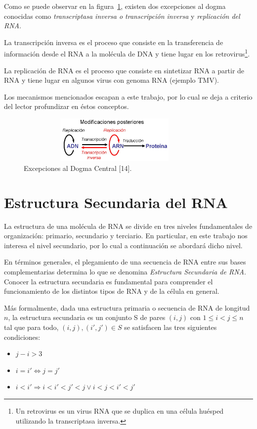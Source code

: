 \par Como se puede observar en la figura~\ref{excepcionesDogma}, existen dos excepciones al dogma conocidas como \textit{transcriptasa inversa o transcripción inversa} y \textit{replicación del RNA}.
\par La transcripción inversa\cite{curtis} es el proceso que consiste en la transferencia de información desde el RNA a la molécula de DNA y tiene lugar en los retrovirus\footnote{Un retrovirus es un virus RNA que se duplica en una célula huésped utilizando la transcriptasa inversa.}.
\par La replicación de RNA\cite{curtis} es el proceso que consiste en sintetizar RNA a partir de RNA y tiene lugar en algunos virus con genoma RNA (ejemplo TMV).
\par Los mecanismos mencionados escapan a este trabajo, por lo cual se deja a criterio del lector profundizar en éstos conceptos.
\begin{figure} [h]
	\hspace*{2cm}\includegraphics[width=3.8209in,height=0.9000in]{image/excepcionesDogma.jpg}
	\caption{Excepciones al Dogma Central [14].}
	\label{excepcionesDogma}
\end{figure}	

\vskip 1cm
\section{Estructura Secundaria del RNA} 
La estructura de una molécula de RNA se divide en tres niveles fundamentales de organización: primario, secundario y terciario. En particular, en este trabajo nos interesa el nivel secundario, por lo cual a continuación se abordará dicho nivel.

\par En términos generales, el plegamiento de una secuencia de RNA entre sus bases complementarias determina lo que se denomina \emph{Estructura Secundaria de RNA}. Conocer la estructura secundaria es fundamental para comprender el funcionamiento de los distintos tipos de RNA y de la célula en general. 

\par Más formalmente, dada una estructura primaria o secuencia de RNA de longitud $n$, la estructura secundaria es un conjunto S de pares $(i,j)$ con $1\leq i < j \leq n$ tal que para todo, $(i,j), (i',j') \in S$ se satisfacen las tres siguientes     condiciones:
\begin{itemize}
	\item $j-i > 3$
    \item $i=i' \Leftrightarrow j=j'$
    \item $i< i'\Rightarrow i < i' < j' < j \lor i < j < i' < j'$ 
\end{itemize}


